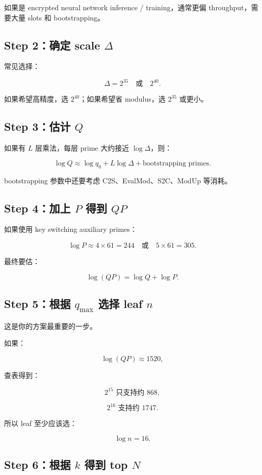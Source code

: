 \documentclass[UTF8,11pt,a4paper]{ctexart}
\begin{document}
如果是 encrypted neural network inference / training，通常更偏 throughput，需要大量 slots 和 bootstrapping。

\subsection{Step 2：确定 scale $\Delta$}

常见选择：

\[
\Delta=2^{35}\quad\text{或}\quad 2^{40}.
\]

如果希望高精度，选 $2^{40}$；如果希望省 modulus，选 $2^{35}$ 或更小。

\subsection{Step 3：估计 $Q$}

如果有 $L$ 层乘法，每层 prime 大约接近 $\log\Delta$，则：

\[
\log Q
\approx
\log q_0 + L\log\Delta + \text{bootstrapping primes}.
\]

bootstrapping 参数中还要考虑 C2S、EvalMod、S2C、ModUp 等消耗。

\subsection{Step 4：加上 $P$ 得到 $QP$}

如果使用 key switching auxiliary primes：

\[
\log P \approx 4\times61=244
\quad \text{或}\quad
5\times61=305.
\]

最终要估：

\[
\log(QP)=\log Q+\log P.
\]

\subsection{Step 5：根据 $q_{\max}$ 选择 leaf $n$}

这是你的方案最重要的一步。

如果：

\[
\log(QP)\approx 1520,
\]

查表得到：

\[
2^{15}\text{ 只支持约 }868,
\]

\[
2^{16}\text{ 支持约 }1747.
\]

所以 leaf 至少应该选：

\[
\boxed{
\log n=16.
}
\]

\subsection{Step 6：根据 $k$ 得到 top $N$}
\end{document}
